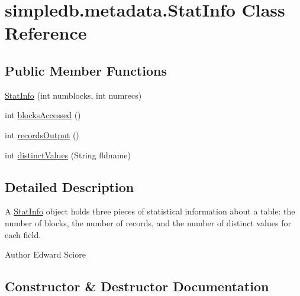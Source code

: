 \hypertarget{classsimpledb_1_1metadata_1_1StatInfo}{}\section{simpledb.\+metadata.\+Stat\+Info Class Reference}
\label{classsimpledb_1_1metadata_1_1StatInfo}
\subsection*{Public Member Functions}
\begin{DoxyCompactItemize}
\item 
\hyperlink{classsimpledb_1_1metadata_1_1StatInfo_a41069c4ee6db6c259d37b3e731bc6456}{Stat\+Info} (int numblocks, int numrecs)
\item 
int \hyperlink{classsimpledb_1_1metadata_1_1StatInfo_a7e29f4b50659bef0e6c27afcc69d8e8f}{blocks\+Accessed} ()
\item 
int \hyperlink{classsimpledb_1_1metadata_1_1StatInfo_a44040cb918b4c2130605e43e06d7e833}{records\+Output} ()
\item 
int \hyperlink{classsimpledb_1_1metadata_1_1StatInfo_a50af6cd74d6166400e5921d982ba8264}{distinct\+Values} (String fldname)
\end{DoxyCompactItemize}


\subsection{Detailed Description}
A \hyperlink{classsimpledb_1_1metadata_1_1StatInfo}{Stat\+Info} object holds three pieces of statistical information about a table\+: the number of blocks, the number of records, and the number of distinct values for each field. \begin{DoxyAuthor}{Author}
Edward Sciore 
\end{DoxyAuthor}


\subsection{Constructor \& Destructor Documentation}
\mbox{\label{classsimpledb_1_1metadata_1_1StatInfo_a41069c4ee6db6c259d37b3e731bc6456}} 
